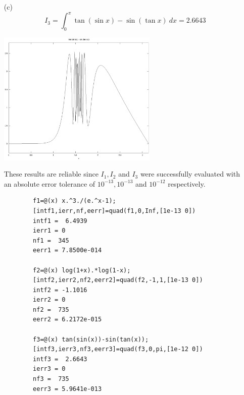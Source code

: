 \documentclass[11pt,a4paper]{article}
\begin{document}
\begin{enumerate}
	\item[(c)] $$I_3=\int^{\pi}_0 \tan(\sin x)-\sin(\tan x) \ dx = 2.6643$$
	\begin{center}
		\includegraphics[width=0.6\textwidth]{f3.eps}
	\end{center}
	These results are reliable since $I_1, I_2$ and $I_3$ were successfully evaluated with an absolute error tolerance of $10^{-13}, 10^{-13}$ and $10^{-12}$ respectively.
	
	\begin{verbatim}
		f1=@(x) x.^3./(e.^x-1);
		[intf1,ierr,nf,eerr]=quad(f1,0,Inf,[1e-13 0])
		intf1 =  6.4939
		ierr1 = 0
		nf1 =  345
		eerr1 = 7.8500e-014
	
		f2=@(x) log(1+x).*log(1-x);
		[intf2,ierr2,nf2,eerr2]=quad(f2,-1,1,[1e-13 0])
		intf2 = -1.1016
		ierr2 = 0
		nf2 =  735
		eerr2 = 6.2172e-015

		f3=@(x) tan(sin(x))-sin(tan(x));
		[intf3,ierr3,nf3,eerr3]=quad(f3,0,pi,[1e-12 0])
		intf3 =  2.6643
		ierr3 = 0
		nf3 =  735
		eerr3 = 5.9641e-013
	\end{verbatim}
\end{enumerate}

\pagebreak
\end{document}
